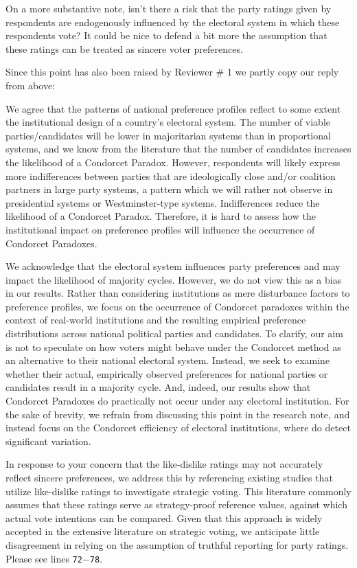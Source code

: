 \documentclass[a4paper, 12pt]{scrartcl}
\theoremstyle{break}
\newenvironment{changes}{\par\color{violet}\par\addvspace{\baselineskip}}{\par\addvspace{\baselineskip}}
\begin{document}
\begin{changes}
On a more substantive note, isn’t there a risk that the party ratings given by respondents are endogenously influenced by the electoral system in which these respondents vote? It could be nice to defend a bit more the assumption that these ratings can be treated as sincere voter preferences.
\end{changes}
Since this point has also been raised by Reviewer \# 1 we partly copy our reply from above: 

We agree that the patterns of national preference profiles reflect to some extent the institutional design of a country's electoral system. The number of viable parties/candidates will be lower in majoritarian systems than in proportional systems, and we know from the literature that the number of candidates increases the likelihood of a Condorcet Paradox. However, respondents will likely express more indifferences between parties that are ideologically close and/or coalition partners in large party systems, a pattern which we will rather not observe in presidential systems or Westminster-type systems. Indifferences reduce the likelihood of a Condorcet Paradox. Therefore, it is hard to assess how the institutional impact on preference profiles will influence the occurrence of Condorcet Paradoxes. 

We acknowledge that the electoral system influences party preferences and may impact the likelihood of majority cycles. However, we do not view this as a bias in our results. Rather than considering institutions as mere disturbance factors to preference profiles, we focus on the occurrence of Condorcet paradoxes within the context of real-world institutions and the resulting empirical preference distributions across national political parties and candidates. To clarify, our aim is not to speculate on how voters might behave under the Condorcet method as an alternative to their national electoral system. Instead, we seek to examine whether their actual, empirically observed preferences for national parties or candidates result in a majority cycle. And, indeed, our results show that Condorcet Paradoxes do practically not occur under any electoral institution. For the sake of brevity, we refrain from discussing this point in the research note, and instead focus on the Condorcet efficiency of electoral institutions, where do detect significant variation.

In response to your concern that the like-dislike ratings may not accurately reflect sincere preferences, we address this by referencing existing studies that utilize like-dislike ratings to investigate strategic voting. This literature commonly assumes that these ratings serve as strategy-proof reference values, against which actual vote intentions can be compared. Given that this approach is widely accepted in the extensive literature on strategic voting, we anticipate little disagreement in relying on the assumption of truthful reporting for party ratings. Please see lines \texttt{72$-$78}. 
\end{document}
